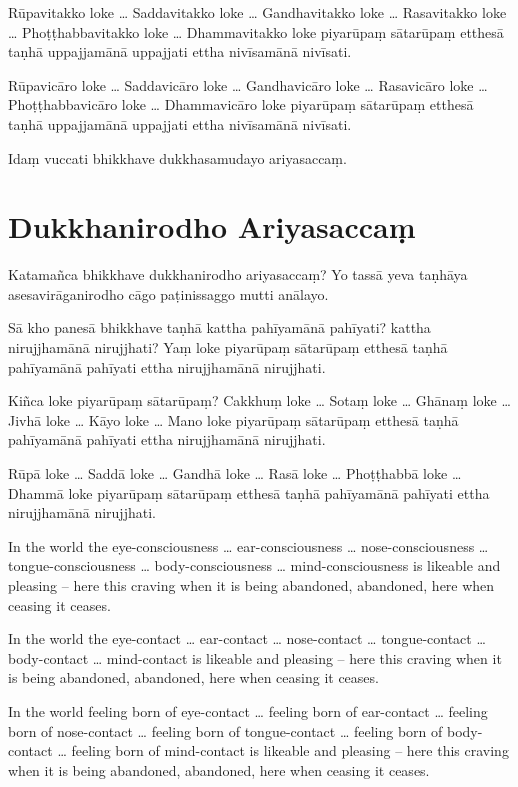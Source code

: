 \paliPage

Rūpavitakko loke \ldots{} Saddavitakko loke \ldots{} Gandhavitakko loke \ldots{}
Rasavitakko loke \ldots{} Phoṭṭhabbavitakko loke \ldots{} Dhammavitakko loke
piyarūpaṃ sātarūpaṃ etthesā taṇhā uppajjamānā uppajjati ettha nivīsamānā
nivīsati.

Rūpavicāro loke \ldots{} Saddavicāro loke \ldots{} Gandhavicāro loke \ldots{}
Rasavicāro loke \ldots{} Phoṭṭhabbavicāro loke \ldots{} Dhammavicāro loke
piyarūpaṃ sātarūpaṃ etthesā taṇhā uppajjamānā uppajjati ettha nivīsamānā
nivīsati.

Idaṃ vuccati bhikkhave dukkhasamudayo ariyasaccaṃ.

\section*{Dukkhanirodho Ariyasaccaṃ}

Katamañca bhikkhave dukkhanirodho ariyasaccaṃ? Yo tassā yeva taṇhāya
asesavirāganirodho cāgo paṭinissaggo mutti anālayo.

Sā kho panesā bhikkhave taṇhā kattha pahīyamānā pahīyati? kattha nirujjhamānā
nirujjhati? Yaṃ loke piyarūpaṃ sātarūpaṃ etthesā taṇhā pahīyamānā pahīyati ettha
nirujjhamānā nirujjhati.

Kiñca loke piyarūpaṃ sātarūpaṃ? Cakkhuṃ loke \ldots{} Sotaṃ loke \ldots{} Ghānaṃ
loke \ldots{} Jivhā loke \ldots{} Kāyo loke \ldots{} Mano loke piyarūpaṃ
sātarūpaṃ etthesā taṇhā pahīyamānā pahīyati ettha nirujjhamānā nirujjhati.

Rūpā loke \ldots{} Saddā loke \ldots{} Gandhā loke \ldots{} Rasā loke \ldots{}
Phoṭṭhabbā loke \ldots{} Dhammā loke piyarūpaṃ sātarūpaṃ etthesā taṇhā
pahīyamānā pahīyati ettha nirujjhamānā nirujjhati.

\englishPage

In the world the eye-consciousness \ldots{} ear-consciousness \ldots{}
nose-consciousness \ldots{} tongue-consciousness \ldots{} body-consciousness
\ldots{} mind-consciousness is likeable and pleasing -- here this craving when
it is being abandoned, abandoned, here when ceasing it ceases.

In the world the eye-contact \ldots{} ear-contact \ldots{} nose-contact \ldots{}
tongue-contact \ldots{} body-contact \ldots{} mind-contact is likeable and
pleasing -- here this craving when it is being abandoned, abandoned, here when
ceasing it ceases.

In the world feeling born of eye-contact \ldots{} feeling born of ear-contact
\ldots{} feeling born of nose-contact \ldots{} feeling born of tongue-contact
\ldots{} feeling born of body-contact \ldots{} feeling born of mind-contact is
likeable and pleasing -- here this craving when it is being abandoned, abandoned,
here when ceasing it ceases.

